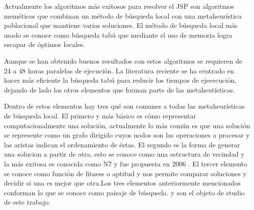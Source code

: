 Actualmente los algoritmos más exitosos para resolver el JSP son algoritmos meméticos que combinan un método de búsqueda local con una metaheurística poblacional que mantiene varias soluciones. El método de búsqueda local más usado se conoce como búsqueda tabú que mediante el uso de memoria logra escapar de óptimos locales.

Aunque se han obtenido buenos resultados con estos algoritmos se requieren de 24 a 48 horas paralelas de ejecución. La literatura reciente se ha centrado en hacer más eficiente la búsqueda tabú para reducir los tiempos de ejececución, dejando de lado los otros elementos que forman parte de las metaheutísticas. 

Dentro de estos elementos hay tres qué son comunes a todas las metaheurísticas de búsqueda local. El primero y más básico es cómo representar computacionalmente una solución, actualmente lo más común es que una solución se represente como un grafo dirigido cuyos nodos son las operaciones a procesar y las aristas indican el ordenamiento de éstas. El segundo es la forma de generar una solucion a partir de otra, esto se conoce como una estructura de vecindad y la más exitosa es conocida como N7 y fue propuesta en 2006 \cite{Zhang2007}. El tercer elemento se conoce como función de fitness o aptitud y nos permite comparar soluciones y decidir si una es mejor que otra.Los tres elementos anteriormente mencionados conforman lo que se conoce como paisaje de búsqueda. y son el objeto de studio de este trabajo.
